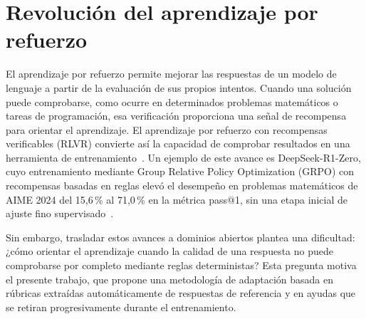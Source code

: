 \section{Revolución del aprendizaje por refuerzo}

El aprendizaje por refuerzo permite mejorar las respuestas de un modelo de lenguaje a partir de la evaluación de sus propios intentos. Cuando una solución puede comprobarse, como ocurre en determinados problemas matemáticos o tareas de programación, esa verificación proporciona una señal de recompensa para orientar el aprendizaje. El aprendizaje por refuerzo con recompensas verificables (RLVR) convierte así la capacidad de comprobar resultados en una herramienta de entrenamiento~\cite{shao2024deepseekmath,deepseek2025r1}. Un ejemplo de este avance es DeepSeek-R1-Zero, cuyo entrenamiento mediante Group Relative Policy Optimization (GRPO) con recompensas basadas en reglas elevó el desempeño en problemas matemáticos de AIME 2024 del 15,6\,\% al 71,0\,\% en la métrica pass@1, sin una etapa inicial de ajuste fino supervisado~\cite{deepseek2025r1}.

Sin embargo, trasladar estos avances a dominios abiertos plantea una dificultad: ¿cómo orientar el aprendizaje cuando la calidad de una respuesta no puede comprobarse por completo mediante reglas deterministas? Esta pregunta motiva el presente trabajo, que propone una metodología de adaptación basada en rúbricas extraídas automáticamente de respuestas de referencia y en ayudas que se retiran progresivamente durante el entrenamiento.
